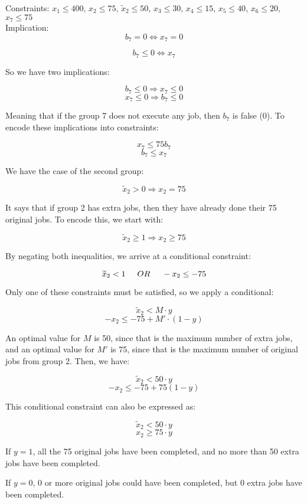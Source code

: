 \documentclass[11pt, oneside]{article}   	%
\begin{document}
Constraints: $x_1 \leq 400$, $x_2 \leq 75$, $\widetilde{x}_2 \leq 50$, $x_3 \leq 30$, $x_4 \leq 15$, $x_5 \leq 40$, $x_6 \leq 20$, $x_7 \leq 75$\\

Implication: 
$$b_7 = 0 \Longleftrightarrow x_7 = 0$$ 

$$b_7 \leq 0 \Longleftrightarrow x_7$$

So we have two implications:

$$b_7 \leq 0 \Longrightarrow x_7 \leq 0$$
$$x_7 \leq 0 \Longrightarrow b_7 \leq 0$$

Meaning that if the group 7 does not execute any job, then $b_7$ is false (0). To encode these implications into constraints:

$$x_7 \leq 75 b_7$$
$$b_7 \leq x_7$$ 

We have the case of the second group:

$$\widetilde{x}_2 > 0 \Longrightarrow x_2 = 75$$

It says that if group 2 has extra jobs, then they have already done their 75 original jobs. To encode this, we start with:

$$\widetilde{x}_2 \geq 1 \Longrightarrow x_2 \geq 75$$

By negating both inequalities, we arrive at a conditional constraint:

$$\widetilde{x}_2 < 1 \hspace{5 mm} OR \hspace{5 mm}  -x_2 \leq -75$$

Only one of these constraints must be satisfied, so we apply a conditional:

$$\widetilde{x}_2 < M\cdot y$$
$$-x_2 \leq -75 + M'\cdot (1 - y)$$

An optimal value for $M$ is 50, since that is the maximum number of extra jobs, and an optimal value for $M'$ is 75, since that is the maximum number of original jobs from group 2. Then, we have:

$$\widetilde{x}_2 < 50\cdot y$$
$$-x_2 \leq -75 + 75(1 - y)$$

This conditional constraint can also be expressed as:

$$\widetilde{x}_2 < 50\cdot y$$
$$x_2 \geq 75\cdot y$$

If $y = 1$, all the 75 original jobs have been completed, and no more than 50 extra jobs have been completed.

If $y = 0$,  0 or more original jobs could have been completed, but 0 extra jobs have been completed.
\end{document}
